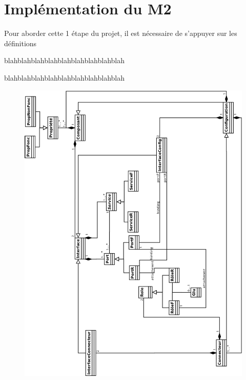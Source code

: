 \chapter{Implémentation du M2}

Pour aborder cette 1 étape du projet, il est nécessaire de s'appuyer sur les définitions




blahblahblahblahblahblahblahblahblah

blahblahblahblahblahblahblahblahblah
\begin{figure}[htb]
\includegraphics[scale=0.31]{img/M2}
\end{figure}
